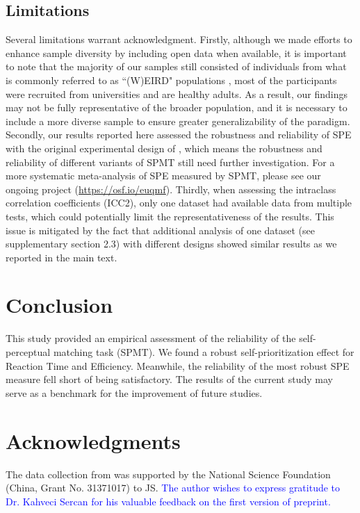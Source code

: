 \documentclass[sn-apa]{sn-jnl}%
\theoremstyle{thmstyleone}%
\theoremstyle{thmstyletwo}%
\theoremstyle{thmstylethree}%
\begin{document}
\subsection{Limitations}\label{subsec:lim}
Several limitations warrant acknowledgment. Firstly, although we made efforts to enhance sample diversity by including open data when available, it is important to note that the majority of our samples still consisted of individuals from what is commonly referred to as ``(W)EIRD" populations \parencite{rad2018toward,yue2023weird}, most of the participants were recruited from universities and are healthy adults. As a result, our findings may not be fully representative of the broader population, and it is necessary to include a more diverse sample to ensure greater generalizability of the paradigm. Secondly, our results reported here assessed the robustness and reliability of SPE with the original experimental design of \textcite{sui2012perceptual}, which means the robustness and reliability of different variants of SPMT still need further investigation. For a more systematic meta-analysis of SPE measured by SPMT, please see our ongoing project (\url{https://osf.io/euqmf}). Thirdly, when assessing the intraclass correlation coefficients (ICC2), only one dataset had available data from multiple tests, which could potentially limit the representativeness of the results. This issue is mitigated by the fact that additional analysis of one dataset (see supplementary section 2.3) with different designs showed similar results as we reported in the main text. 

\section{Conclusion}\label{sec13}

This study provided an empirical assessment of the reliability of the self-perceptual matching task (SPMT). We found a robust self-prioritization effect for Reaction Time and Efficiency. Meanwhile, the reliability of the most robust SPE measure fell short of being satisfactory. The results of the current study may serve as a benchmark for the improvement of future studies.

\section*{Acknowledgments}

The data collection from \textcite{hu2023data} was supported by the National Science Foundation (China, Grant No. 31371017) to JS. \textcolor{blue}{The author wishes to express gratitude to Dr. Kahveci Sercan for his valuable feedback on the first version of preprint.}
\end{document}
